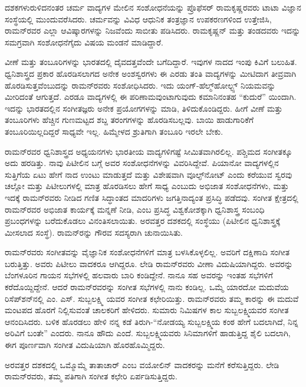ದಶಕಗಳುರುಳಿದನಂತರ ಚರ್ಮ ವಾದ್ಯಗಳ ಮೇಲಿನ ಸಂಶೋಧನೆಯನ್ನು ಪ್ರೊಫೆಸರ್ ರಾಮಕೃಷ್ಣರವರು ಟಾಟಾ ವಿಜ್ಞಾನ ಸಂಸ್ಥೆಯಲ್ಲಿ ಮುಂದುವರೆಸಿದರು. ಚರ್ಮವನ್ನು ವಿವಿಧ ಆಧುನಿಕ ತಂತ್ರಜ್ಞಾನ ಉಪಕರಣಗಳಿಂದ ಉತ್ತೇಜಿಸಿ, ರಾಮನ್‍ರವರ ಎಲ್ಲಾ ಆವಿಷ್ಕಾರಗಳನ್ನು ನಿಜವೆಂದು ಸಾಬೀತು ಪಡಿಸಿದರು. ರಾಮಕೃಷ್ಣನ್ ಮತ್ತು ತಂಡದವರು ಇದನ್ನು ಸಮಗ್ರವಾಗಿ ಸಂಶೋಧನೆಗೈದು ವಿಷಯ ಮಂಡನೆ ಮಾಡಿದ್ದಾರೆ.

ವೀಣೆ ಮತ್ತು ತಂಬೂರಿಗಳನ್ನು ಭಾರತದಲ್ಲಿ ದೈವದತ್ತವೆಂದೇ ಬಗೆದಿದ್ದಾರೆ. ಇವುಗಳ ನಾದದ ಇಂಪು ಕಿವಿಗೆ ಬಲುಹಿತ. ಧ್ವನಿಶಾಸ್ತ್ರದ ಪ್ರಕಾರ ಹೊರಡಿಸಲಾಗದ ಅನೇಕ ಅಂಶಸ್ವರಗಳು ಈ ಎರಡು ತಂತಿ ವಾದ್ಯಗಳನ್ನು ಮೀಟಿದಾಗ ತೀವ್ರವಾಗಿ ಹೊರಡಿಸುತ್ತವೆಂಬುದನ್ನು ರಾಮನ್‍ರವರು ಸಂಶೋಧಿಸಿದರು. ಇದು ಯಂಗ್-ಹೆಲ್ಮ್‌ಹೋಲ್ಟ್ಸ್ ನಿಯಮವನ್ನು ಮೀರಿದಂತೆ ಆಗುತ್ತದೆ. ಎರಡೂ ವಾದ್ಯಗಳಲ್ಲಿ ಈ ಪರಿಣಾಮವುಂಟಾಗುವುದು ಕಮಾನಿನಂತಹ “ಕುದುರೆ” ಯಿಂದಾಗಿ. ಇದನ್ನು ಭಾರತದಲ್ಲಿನ ಸಂಗೀತಜ್ಞರು ಅನೇಕ ಪ್ರಯೋಗಗಳನ್ನು ಮಾಡಿ, ತಿಳಿದುಕೊಂಡಿದ್ದರು. ಹೀಗೆ ವೀಣೆ ಮತ್ತು ತಂಬೂರಿಗಳು ಹೆಚ್ಚಿನ ಗುಣಮಟ್ಟದ ಶಬ್ದ ತರಂಗಗಳನ್ನು ಹೊರಡಿಸಬಲ್ಲವು. ಬಾಯಿ ಹಾಡುಗಾರಿಕೆಗೆ ತಂಬೂರಿಯಿಲ್ಲದಿದ್ದರೆ ಸಾಧ್ಯವೇ ಇಲ್ಲ. ಹಿಮ್ಮೇಳದ ಶ್ರುತಿಗಾಗಿ ತಂಬೂರಿ ಇರಲೇ ಬೇಕು.

ರಾಮನ್‍ರವರ ಧ್ವನಿಶಾಸ್ತ್ರದ ಅಧ್ಯಯನಗಳು ಭಾರತೀಯ ವಾದ್ಯಗಳಿಗಷ್ಟೆ ಸೀಮಿತವಾಗಿರಲಿಲ್ಲ. ಪಶ್ಚಿಮದ ಸಂಗೀತಕ್ಕೂ ಅದು ಹರಡಿತ್ತು. ನಾವು ಪಿಟೀಲಿನ ಬಗ್ಗೆ ಅವರ ಸಂಶೋಧನೆಗಳನ್ನು ವಿವರಿಸಿದ್ದೇವೆ. ಪಿಯಾನೋ ವಾದ್ಯಗಳಲ್ಲಿನ ಸುತ್ತಿಗೆಯ ಏಟು ಹೇಗೆ ನಾದ ಉಂಟು ಮಾಡುತ್ತದೆ ಮತ್ತು ವಿಶೇಷವಾಗಿ ವೂಲ್ಫ್‌ನೋಟ್ ಎಂದು ಕರೆಯುವ ಸ್ವರವು ಚಲ್ಲೋ ಮತ್ತು ಪಿಟೀಲುಗಳಲ್ಲಿ ಮಾತ್ರ ಹೊರಡಿಸಲು ಹೇಗೆ ಸಾಧ್ಯ ಎಂಬುದು ಅಭಿಜಾತ ಸಂಶೋಧನೆಗಳು, ಮತ್ತು ಇದಕ್ಕೆ ರಾಮನ್‍ರವರು ನೀಡಿದ ಗಣಿತ ಸಿದ್ಧಾಂತದ ಮಾದರಿಗಳು ಜಗತ್ತಿನಾದ್ಯಂತ ಪ್ರಸಿದ್ಧಿ ಪಡೆದವು. ಸಂಗೀತ ಕ್ಷೇತ್ರದಲ್ಲಿ ರಾಮನ್‍ರವರ ಅಭಿಜಾತ ಕಾರ್ಯಕ್ಕೆ ಮನ್ನಣೆ ನೀಡಿ, \textit{} ಎಂಬ ಪ್ರಸಿದ್ಧ ವಿಶ್ವಕೋಶಕ್ಕಾಗಿ ಧ್ವನಿಶಾಸ್ತ್ರ ಸಂಬಂಧಿ ಪ್ರಬಂಧಗಳನ್ನು ಬರೆದುಕೊಡಲು ವಿನಂತಿಸಲಾಯಿತು. ಅರವತ್ತರ ದಶಕದಲ್ಲಿ  ಸಂಸ್ಥೆಯು (ಪಿಟೀಲಿನ ಧ್ವನಿಶಾಸ್ತ್ರಕ್ಕೆ ಮೀಸಲಾದ ಸಂಸ್ಥೆ). ರಾಮನ್‍ರನ್ನು ಗೌರವ ಸದಸ್ಯರಾಗಿ ಚುನಾಯಿಸಿತು.

ರಾಮನ್‍ರವರು ಸಂಗೀತವನ್ನು ವೈಜ್ಞಾನಿಕ ಸಂಶೋಧನೆಗಳಿಗೆ ಮಾತ್ರ ಬಳಸಿಕೊಳ್ಳಲಿಲ್ಲ. ಅವರಿಗೆ ದಕ್ಷಿಣಾದಿ ಸಂಗೀತ ಬರುತ್ತಿತ್ತು. ಅವರು ಪಿಟೀಲು ವಾದಕರೂ ಆಗಿದ್ದರೂ. ಲೇಡಿ ರಾಮನ್‍ರವರು ವೀಣಾ ವಿದುಷಿಯಾಗಿದ್ದರು. ಅವರನ್ನು ಬೆಂಗಳೂರಿನ ಗಾಯನ ಸಭೆಗಳಲ್ಲಿ ಹಲವಾರು ಬಾರಿ ಕಂಡಿದ್ದೇನೆ. ನಾನೂ ಸಹ ಅವರನ್ನು ಇಂತಹ ಸಭೆಗಳಿಗೆ ಕರೆದೊಯ್ದಿದ್ದೇನೆ. ಆದರೆ ರಾಮನ್‍ರವರನ್ನು ಸಂಗೀತ ಸಭೆಗಳಲ್ಲಿ ನಾನು ಕಂಡಿಲ್ಲ. ಒಮ್ಮೆ ಯಾರದೋ ಮದುವೆಯ ರಿಸೆಪ್‍ಶನ್‍ನಲ್ಲಿ ಎಂ. ಎಸ್. ಸುಬ್ಬಲಕ್ಷ್ಮಿ ಯವರ ಸಂಗೀತ ಕಛೇರಿಯಿತ್ತು. ರಾಮನ್‍ರವರು ತಮ್ಮ ಕಾರನ್ನು ಈ ಮದುವೆ ಮಂಟಪದ ಹೊರಗೆ ನಿಲ್ಲಿಸುವಂತೆ ಚಾಲಕರಿಗೆ ಹೇಳಿದರು. ಸುಮಾರು  ನಿಮಿಷಗಳ ಕಾಲ ಸುಬ್ಬಲಕ್ಷ್ಮಿಯವರ ಸಂಗೀತ ಆನಂದಿಸಿದರು. ಬಳಿಕ ಹೊರಡಲು ಹೇಳಿ ನನ್ನ ಕಡೆ ತಿರುಗಿ-“ನೋಡಯ್ಯ ಸುಬ್ಬಲಕ್ಷ್ಮಿಯ ಕಂಠ ಹೇಗೆ ಬದಲಾಗಿದೆ, ನಿನ್ನ ಅರಿವಿಗೆ ಬಂತೇ” ಎಂದರು. ನಾನೂ ಹೌದು ಎಂದೆ. ಸುಬ್ಬಲಕ್ಷ್ಮಿಯವರು ಸಿನಿಮಾಗಳಿಗೆ ಹಾಡುತ್ತಿದ್ದ ಶೈಲಿ ಬದಲಾಗಿ, ಈಗ ಪೂರ್ಣವಾಗಿ ಸಂಗೀತ ವಿದುಷಿಯಾಗಿ ಹೊರಹೊಮ್ಮಿದ್ದರು.

ಅರವತ್ತರ ದಶಕದಲ್ಲಿ ಒಮ್ಮೊಮ್ಮೆ ತಾತಾಚಾರ್ ಎಂಬ ವಯೋಲಿನ್ ವಾದಕರನ್ನು ಮನೆಗೆ ಕರೆಸುತ್ತಿದ್ದರು. ಲೇಡಿ ರಾಮನ್‍ರವರು, ತಮ್ಮ ಪತಿಗಾಗಿ ಸಂಗೀತ ಕಛೇರಿ ಏರ್ಪಡಿಸುತ್ತಿದ್ದರು.


